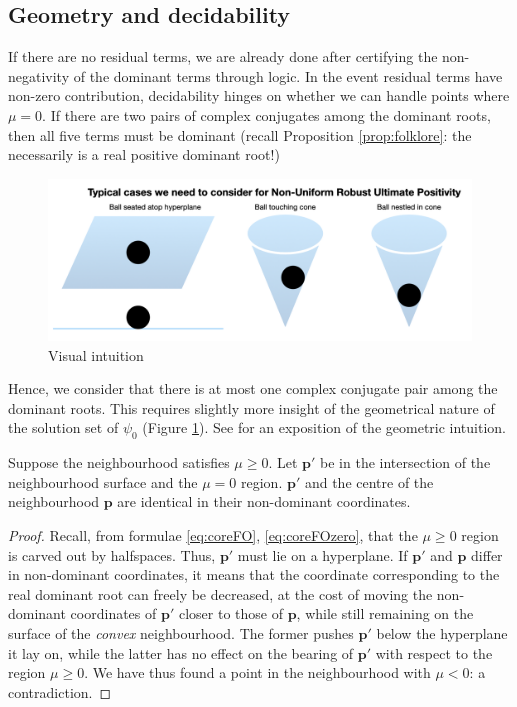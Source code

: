 \subsection{Geometry and decidability}
If there are no residual terms, we are already done after certifying the non-negativity of the dominant terms through logic. In the event residual terms have non-zero contribution, decidability hinges on whether we can handle points where $\mu = 0$. If there are two pairs of complex conjugates among the dominant roots, then all five terms must be dominant (recall Proposition \ref{prop:folklore}: the necessarily is a real positive dominant root!)

\begin{figure}[h]

\includegraphics[width=\textwidth]{picture1.png}
\caption{Visual intuition}
\label{fig:geometricpicture}
\end{figure}

Hence, we consider that there is at most one complex conjugate pair among the dominant roots. This requires slightly more insight of the geometrical nature of the solution set of $\psi_0$ (Figure \ref{fig:geometricpicture}). See \cite{originalstacs,originalarxiv} for an exposition of the geometric intuition. 

\begin{lemma}
Suppose the neighbourhood satisfies $\mu \ge 0$. Let $\mathbf{p'}$ be in the intersection of the neighbourhood surface and the $\mu = 0$ region. $\mathbf{p'}$ and the centre of the neighbourhood $\mathbf{p}$ are identical in their non-dominant coordinates.
\end{lemma}
\begin{proof}
 Recall, from formulae \ref{eq:coreFO}, \ref{eq:coreFOzero}, that the $\mu \ge 0$ region is carved out by halfspaces. Thus, $\mathbf{p'}$ must lie on a hyperplane. If $\mathbf{p'}$ and $\mathbf{p}$ differ in non-dominant coordinates, it means that the coordinate corresponding to the real dominant root can freely be decreased, at the cost of moving the non-dominant coordinates of $\mathbf{p'}$ closer to those of $\mathbf{p}$, while still remaining on the surface of the \textit{convex} neighbourhood. The former pushes $\mathbf{p'}$ below the hyperplane it lay on, while the latter has no effect on the bearing of $\mathbf{p'}$ with respect to the region $\mu \ge 0$. We have thus found a point in the neighbourhood with $\mu < 0$: a contradiction.
 \end{proof}

